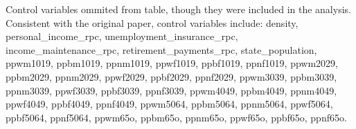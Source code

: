\begin{table}[htbp]
   \par \raggedright 
   Control variables ommited from table, 
                           though they were included in the analysis. 
                           Consistent with the original paper, 
                           control variables include: density, personal\_income\_rpc, unemployment\_insurance\_rpc, income\_maintenance\_rpc, retirement\_payments\_rpc, state\_population, ppwm1019, ppbm1019, ppnm1019, ppwf1019, ppbf1019, ppnf1019, ppwm2029, ppbm2029, ppnm2029, ppwf2029, ppbf2029, ppnf2029, ppwm3039, ppbm3039, ppnm3039, ppwf3039, ppbf3039, ppnf3039, ppwm4049, ppbm4049, ppnm4049, ppwf4049, ppbf4049, ppnf4049, ppwm5064, ppbm5064, ppnm5064, ppwf5064, ppbf5064, ppnf5064, ppwm65o, ppbm65o, ppnm65o, ppwf65o, ppbf65o, ppnf65o.
\end{table}


